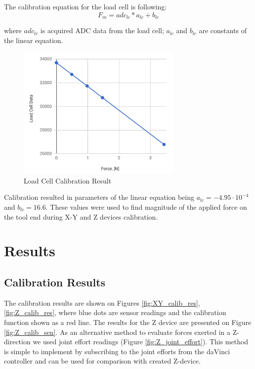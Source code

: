 	The calibration equation for the load cell is following:
\begin{equation}
F_{m} = adc_{lc}*a_{lc} + b_{lc}
\end{equation}

	where $adc_{lc}$ is acquired ADC data from the load cell; $a_{lc}$ and $b_{lc}$ are constants of the linear equation.

\begin{figure}[h]
	\begin{center}
	\includegraphics[width=80mm]{fig/methods/load_cell_calib_data.png}
	\end{center}
	\vspace{-4mm}
	\caption[Load Cell Calibration Result]
	{Load Cell Calibration Result}
	\label{fig:LC_calib_res}
	\vspace{-2mm}
\end{figure}

	Calibration resulted in parameters of the linear equation being  $a_{lc} = -4.95 \cdot 10^{-4}$ and $b_{lc} = 16.6$. These values were used to find magnitude of the applied force on the tool end during X-Y and Z devices calibration.

\section{Results}
\label{sec:res}

\subsection{Calibration Results}
\label{ssec:Cal_Res}

The calibration results are shown on Figures \ref{fig:XY_calib_res}, \ref{fig:Z_calib_res}, where blue dots are sensor readings and the calibration function shown as a red line. The results for the Z device are presented on Figure \ref{fig:Z_calib_sen}. As an alternative method to evaluate forces exerted in a Z-direction we used joint effort readings (Figure \ref{fig:Z_joint_effort}). This method is simple to implement by subscribing to the joint efforts from the daVinci controller and can be used for comparison with created Z-device.

